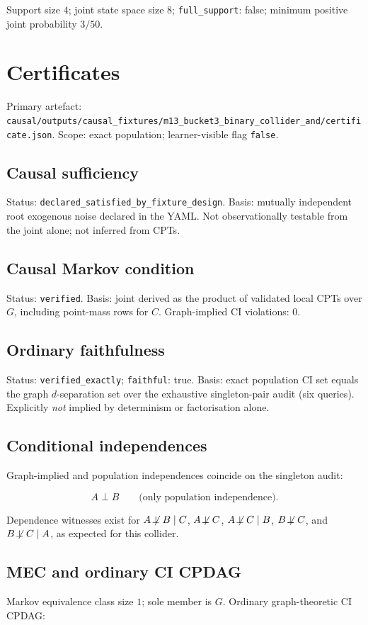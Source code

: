 \documentclass[11pt]{article}
\begin{document}
Support size \(4\); joint state space size \(8\); \texttt{full\_support}: false;
minimum positive joint probability \(3/50\).

\section{Certificates}

Primary artefact:
\texttt{causal/outputs/causal\_fixtures/m13\_bucket3\_binary\_collider\_and/certificate.json}.
Scope: exact population; learner-visible flag \texttt{false}.

\subsection{Causal sufficiency}
Status: \texttt{declared\_satisfied\_by\_fixture\_design}.
Basis: mutually independent root exogenous noise declared in the YAML.
Not observationally testable from the joint alone; not inferred from CPTs.

\subsection{Causal Markov condition}
Status: \texttt{verified}.
Basis: joint derived as the product of validated local CPTs over \(G\),
including point-mass rows for \(C\). Graph-implied CI violations: \(0\).

\subsection{Ordinary faithfulness}
Status: \texttt{verified\_exactly}; \texttt{faithful}: true.
Basis: exact population CI set equals the graph \(d\)-separation set over the
exhaustive singleton-pair audit (six queries).
Explicitly \emph{not} implied by determinism or factorisation alone.

\subsection{Conditional independences}
Graph-implied and population independences coincide on the singleton audit:

\[
A \perp B
\qquad\text{(only population independence).}
\]

Dependence witnesses exist for \(A\not\!\perp B\mid C\), \(A\not\!\perp C\),
\(A\not\!\perp C\mid B\), \(B\not\!\perp C\), and \(B\not\!\perp C\mid A\),
as expected for this collider.

\subsection{MEC and ordinary CI CPDAG}
Markov equivalence class size \(1\); sole member is \(G\).
Ordinary graph-theoretic CI CPDAG:
\end{document}

